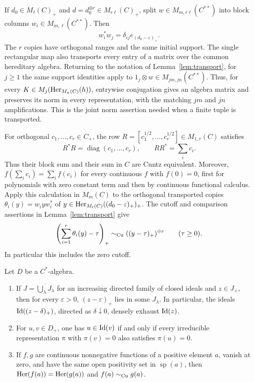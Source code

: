 If \(d_0\in M_\ell(C)_+\) and \(d=d_0^{\oplus r}\in
M_{r\ell}(C)_+\), split \(w\in M_{m,r\ell}(C^{**})\) into
block columns \(w_i\in M_{m,\ell}(C^{**})\).  Then
\[
 w_i^*w_j=\delta_{ij}e_{(d_0-\varepsilon)_+}.
\]
The \(r\) copies have orthogonal ranges and the same initial support.
The single rectangular map also transports every entry of a matrix
over the common hereditary algebra.  Returning to the notation of
Lemma~\ref{lem:transport}, for \(j\ge1\) the same support
identities apply to
\(1_j\otimes w\in M_{jm,jn}(C^{**})\).  Thus, for every
\(K\in M_j(\operatorname{Her}_{M_n(C)}(h))\), entrywise conjugation gives an
algebra matrix and preserves its norm in every representation, with
the matching \(jm\) and \(jn\) amplifications.  This is the joint
norm assertion needed when a finite tuple is transported.

For orthogonal \(c_1,\ldots,c_r\in C_+\), the row
\(R=[c_1^{1/2},\ldots,c_r^{1/2}]\in M_{1,r}(C)\) satisfies
\[
 R^*R=\operatorname{diag}(c_1,\ldots,c_r),\qquad
 RR^*=\sum_i c_i.
\]
Thus their block sum and their sum in \(C\) are Cuntz equivalent.
Moreover, \(f(\sum_i c_i)=\sum_i f(c_i)\) for every continuous
\(f\) with \(f(0)=0\), first for polynomials with zero constant term
and then by continuous functional calculus.  Apply this calculation
in \(M_m(C)\) to the orthogonal transported copies
\(\theta_i(y)=w_i y w_i^*\) of
\(y\in\operatorname{Her}_{M_\ell(C)}((d_0-\varepsilon)_+)_+\).
The cutoff and comparison assertions in
Lemma~\ref{lem:transport} give
\begin{equation}\label{eq:orthogonal-copy-cutoffs}
 \left(\sum_{i=1}^r\theta_i(y)-\tau\right)_+
 \sim_{\mathrm{Cu}} ((y-\tau)_+)^{\oplus r}\qquad(\tau\ge0).
\end{equation}
In particular this includes the zero cutoff.

\begin{lemma}\label{lem:ideals-cutoffs}
Let \(D\) be a \(C^*\)-algebra.
\begin{enumerate}[label=\textup{(\roman*)}]
\item If \(J=\overline{\bigcup_\lambda J_\lambda}\) for an
increasing directed family of closed ideals and \(z\in J_+\), then
for every \(\varepsilon>0\), \((z-\varepsilon)_+\) lies in some
\(J_\lambda\).  In particular, the ideals
\(\operatorname{Id}((z-\delta)_+)\), directed as \(\delta\downarrow0\), densely
exhaust \(\operatorname{Id}(z)\).
\item For \(u,v\in D_+\), one has \(u\in\operatorname{Id}(v)\) if and only if
every irreducible representation \(\pi\) with \(\pi(v)=0\)
also satisfies \(\pi(u)=0\).
\item If \(f,g\) are continuous nonnegative functions of a
positive element \(a\), vanish at zero, and have the same open
positivity set in \(\operatorname{sp}(a)\), then
\(\operatorname{Her}(f(a))=\operatorname{Her}(g(a))\) and \(f(a)\sim_{\mathrm{Cu}} g(a)\).
\end{enumerate}
\end{lemma}

